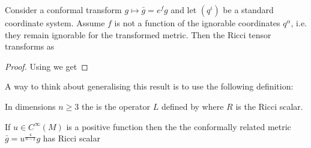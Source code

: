 \documentclass{article}
\begin{document}
\begin{lemma}
	Consider a conformal transform $g \mapsto \bar{g}= e^f g$ and let $(q^i)$ be a standard coordinate system. Assume $f$ is not a function of the ignorable coordinates $q^\alpha$, i.e. they remain ignorable for the transformed metric. Then the Ricci tensor transforms as  
\end{lemma}
\begin{proof}
	Using 
we get 
\end{proof}

A way to think about generalising this result is to use the following definition:

\begin{definition}
	In dimensions $n \geq 3$ the  is the operator $L$ defined by 
where $R$ is the Ricci scalar. 
\end{definition}

\begin{lemma}
	If $u\in C^\infty(M)$ is a positive function then the the conformally related metric $\bar{g} = u^{\frac{4}{n-2}}g$ has Ricci scalar 
\end{lemma}


\begin{comment}
Suppose we make the transform $H \to \tilde{H} = e^{2f}H$ for $f \in C^\infty(Q)$, the LCSCs become (using the notation $\del_j f = f_{j}, \ ,\del_i\del_j f = f_{ij}, \, \del^iH = H^i, \dots$ and again not summing over $i,j$) (\hl{is this correct?}).
\eq{
0 =& e^{6f}\left\lbrace H^{ij}(H_{i} + Hf_{i})(H_{j} + Hf_{j}) + (H f_i f_j + Hf_{ij} + H_i f_j + H_j f_i + H_{ij})H^i H^j \right.\\
& \left. - (H^i_j + H^i f_j)(H_i + Hf_i)H^j - (H^j_i + H^j f_i)(H_j + Hf_j)H^i \right\rbrace \\
\Rightarrow 0 =& H^{ij}(HH_i f_j + HH_j f_i + H^2 f_i f_j) + H^i H^j(H f_i f_j + H f_{ij} + H_i f_j + H_j f_i) \\
& - H^j(H H^i_j f_i + H^i H_i f_j + H^i H f_i f_j)  - H^i(H H^j_i f_j + H^j H_j f_i + H^j H f_i f_j) \\
=& H\psquare{H^{ij}(H_i f_j + H_j f_i + H f_i f_j) +  H^i H^j(f_{ij} - f_i f_j) - (H^j H^i_j + H^i H^j_i)} 
}
If we have a diagonal separable metric $g^{aa}$ s.t. $H = \frac{1}{2} g^{aa} p_a^2$ we get 
\eq{
0 &= \pbrace{ f_{ab} - f_a f_b - (\del_b \log g^{aa} + \del_a \log g^{bb})} g^{aa}g^{bb}p_a p_b
}
\end{comment}
\end{document}
